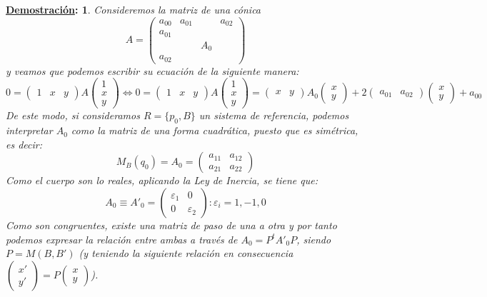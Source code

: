 \documentclass[10pt,a4paper,openright]{book}
\theoremstyle{break}
\newtheorem*{demo}{\underline{Demostración}:}
\begin{document}
\begin{demo}
Consideremos la matriz de una cónica
$$A = \left(\begin{array}{c|ccc}
a_{00}  & a_{01} & & a_{02} \\
\hline
a_{01} & & &  \\
 & & A_0 & \\
a_{02} & & &
\end{array}
\right)$$
y veamos que podemos escribir su ecuación de la siguiente manera:
$$0 = \begin{pmatrix}
1 & x & y
\end{pmatrix} A \begin{pmatrix}
1 \\ x \\ y
\end{pmatrix} \Leftrightarrow 0 = \begin{pmatrix}
1 & x & y
\end{pmatrix} A \begin{pmatrix}
1 \\ x \\ y
\end{pmatrix} = \begin{pmatrix}
x & y
\end{pmatrix} A_0 \begin{pmatrix}
x \\ y
\end{pmatrix} + 2 \begin{pmatrix}
a_{01} & a_{02} \end{pmatrix} \begin{pmatrix}
x \\ y
\end{pmatrix} + a_{00} $$
De este modo, si consideramos $R = \{p_0, B\}$ un sistema de referencia, podemos interpretar $A_0$ como la matriz de una forma cuadrática, puesto que es simétrica, es decir:
$$M_B (q_0) = A_0 = \begin{pmatrix}
a_{11} & a_{12} \\ a_{21} & a_{22}
\end{pmatrix}$$
Como el cuerpo son lo reales, aplicando la Ley de Inercia, se tiene que:
$$A_0 \equiv A'_0 = \begin{pmatrix}
\varepsilon_1 & 0 \\ 0 & \varepsilon_2
\end{pmatrix}: \varepsilon_i = 1, - 1, 0$$
Como son congruentes, existe una matriz de paso de una a otra y por tanto podemos expresar la relación entre ambas a través de $A_0 = P^t  A'_0 P $, siendo $P = M(B, B')$ (y teniendo la siguiente relación en consecuencia $\begin{pmatrix}
x' \\ y'
\end{pmatrix} = P \begin{pmatrix}
x \\ y
\end{pmatrix}$).


\end{demo}
\end{document}
